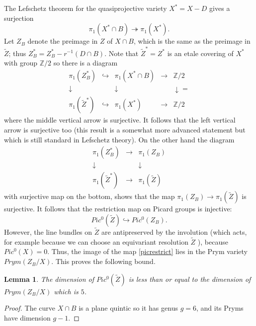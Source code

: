\documentclass{amsart}
\theoremstyle{plain}
\newtheorem{lemma}[theorem]{Lemma}
\numberwithin{equation}{section}
\begin{document}
The Lefschetz theorem for the quasiprojective variety $X^{\ast} = X-D$ 
gives a surjection
$$
\pi _1(X^{\ast}\cap B)\twoheadrightarrow \pi _1(X^{\ast}).
$$
Let $Z_B$ denote the preimage in $Z$ of $X\cap B$, 
which  is the same as
the preimage in $\tilde{Z}$; thus $Z_B^{\ast}= Z_B^{\ast} - r^{-1}(D\cap B)$.
Note that $\tilde{Z}^{\ast}=Z^{\ast}$ is an etale covering of $X^{\ast}$
with group ${{\mathbb Z}} /2$
so there is a diagram 
$$
\begin{array}{ccccc}
\pi _1(Z_B^{\ast}) & \hookrightarrow & \pi _1(X^{\ast}\cap B) &\rightarrow & {{\mathbb Z}} /2  \\
\downarrow & & \downarrow & & \downarrow {\scriptstyle = }\\
\pi _1(\tilde{Z}^{\ast}) & \hookrightarrow & \pi _1(X^{\ast})&\rightarrow & {{\mathbb Z}} /2
\end{array}
$$
where the middle vertical arrow is surjective. It follows that the left vertical
arrow is surjective too (this result is a somewhat more advanced statement
but which is still standard in Lefschetz theory). On the other hand the
diagram 
$$
\begin{array}{ccc}
\pi _1(Z_B^{\ast}) & \rightarrow & \pi _1(Z_B) \\
\downarrow & & \downarrow \\
\pi _1(\tilde{Z}^{\ast}) & \rightarrow & \pi _1(\tilde{Z})
\end{array}
$$
with surjective map on the bottom,
shows that the map $\pi _1(Z_B) \rightarrow \pi _1(\tilde{Z})$ is surjective.
It follows that the restriction map on Picard groups is injective:
\begin{equation}
\label{picrestrict}
Pic^0(\tilde{Z})\hookrightarrow Pic^0(Z_B).
\end{equation}
However, the line bundles on $\tilde{Z}$ are antipreserved by the involution 
(which acts, for example because we can choose an equivariant resolution $\tilde{Z}$
\cite{Bierstone}), because $Pic^0(X)=0$. Thus, the image of the map
\eqref{picrestrict} lies in the Prym variety $Prym(Z_B/X)$. This proves the
following bound. 

\begin{lemma}
The dimension of $Pic^0(\tilde{Z})$ is less than or equal to 
the dimension of $Prym(Z_B/X)$ which is $5$. 
\end{lemma}
\begin{proof}
The curve $X\cap B$ is a plane quintic so it has genus $g=6$, and its Pryms
have dimension $g-1$.
\end{proof}
\end{document}
